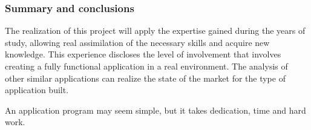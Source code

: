 \begin{frame} [fragile]
	\frametitle{Summary and conclusions}
		The realization of this project will apply the expertise gained during the years of study, allowing real assimilation of the necessary skills and acquire new knowledge. This experience discloses the level of involvement that involves creating a fully functional application in a real environment. The analysis of other similar applications can realize the state of the market for the type of application built.
		
		\bigskip
		An application program may seem simple, but it takes dedication, time and hard work.
	\endblock{}
\end{frame}